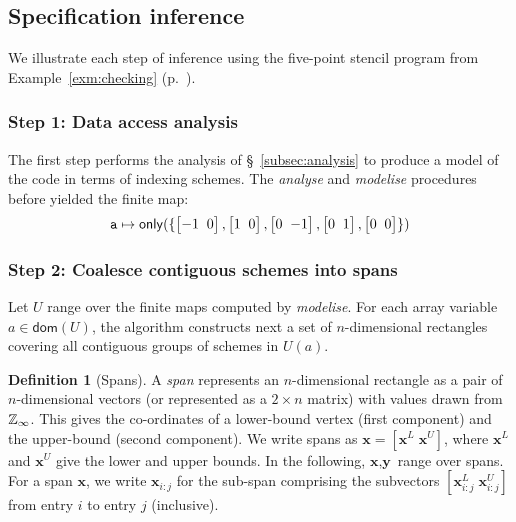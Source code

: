\documentclass[10pt,preprint]{sigplanconf}
\newcounter{block}
\theoremstyle{definition}
\newtheorem{definition}[block]{Definition}
\newcommand{\vect}[1]{\textbf{#1}}
\newcommand{\vtwoh}[2]{\setlength{\arraycolsep}{0em}
\left[\begin{array}{cc}#1 \; & \; #2\end{array}\right]}
\begin{document}
\subsection{Specification inference}
\label{subsec:inference}

We illustrate each step of inference using the
 five-point stencil program from Example~\ref{exm:checking} (p.~\pageref{exm:checking}).

\subsubsection{Step 1: Data access analysis}
\label{sec:inf-step1}

The first step performs the
analysis of \S~\ref{subsec:analysis} to produce a
model of the code in terms of indexing schemes.
The \emph{analyse} and \emph{modelise} procedures before yielded the finite map:
%
\begin{align*}
\texttt{a} \mapsto \mathsf{only}(\{\vtwoh{-1}{0}, \vtwoh{1}{0},
          \vtwoh{0}{-1}, \vtwoh{0}{1}, \vtwoh{0}{0}\})
\end{align*}
%

\subsubsection{Step 2: Coalesce contiguous schemes into spans}
\label{sec:inf-step3}

Let $U$ range over the finite maps computed by \textit{modelise}.  For
each array variable $a \in \mathsf{dom}(U)$, the algorithm constructs next a set of
$n$-dimensional rectangles covering all contiguous groups of schemes
in $U(a)$.

\newcommand{\spanOp}{\textsf{spans}}

\begin{definition}[Spans]
  A \emph{span} represents an $n$-dimensional rectangle
  as a pair of $n$-dimensional vectors (or
  represented as a $2 \times n$ matrix) with values drawn from
  $\mathbb{Z}_\infty{}$. This gives the co-ordinates of a lower-bound vertex
  (first component) and the upper-bound (second component). We write
  spans as $\vect{x} = [\vect{x}^L \; \vect{x}^U]$, where $\vect{x}^L$
  and $\vect{x}^U$ give the lower and upper bounds.  In
  the following, $\vect{x}, \vect{y}$ range over spans.  For a span
  $\vect{x}$, we write $\vect{x}_{i:j}$ for the sub-span comprising the
  subvectors $[\vect{x}^L_{i:j} \; \vect{x}^U_{i:j}]$ from entry $i$
  to entry $j$ (inclusive).
\end{definition}
\end{document}
